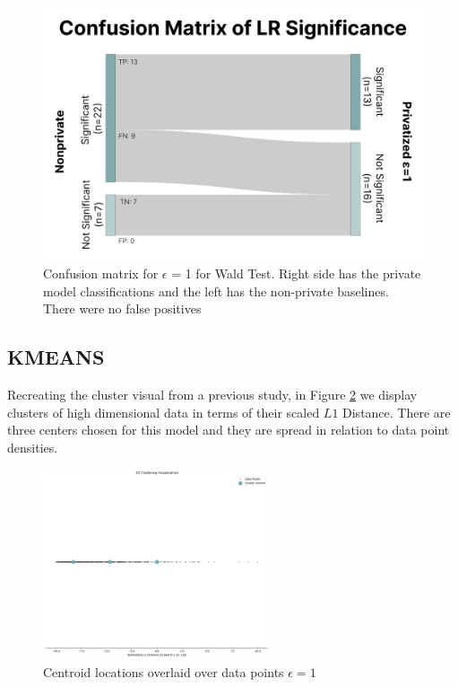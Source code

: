\documentclass[12pt,letterpaper]{article}
\begin{document}
\begin{figure}[H]
\centering
\includegraphics[width=.85\linewidth]{figure/conf_matrix.png}
\caption{Confusion matrix for $\epsilon$ = 1 for Wald Test. Right side has the private model classifications and the left has the non-private baselines. There were no false positives}
\label{fig:conf_matrix}
\end{figure}

\subsection{KMEANS}

Recreating the cluster visual from a previous study, in Figure \ref{fig:centroids} we display clusters of high dimensional data in terms of their scaled $L1$ Distance. There are three centers chosen for this model and they are spread in relation to data point densities.

\begin{figure}[H]
    \centering
    \includegraphics[width=0.6\textwidth]{figure/1d_clusters.png}
    \caption{Centroid locations overlaid over data points $\epsilon=1$}
    \label{fig:centroids}
\end{figure}
\end{document}
